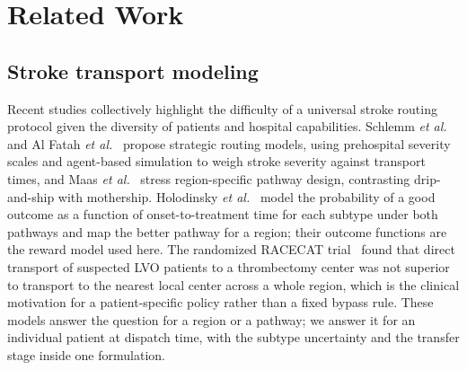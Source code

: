\section{Related Work}
\label{sec:related}

\subsection{Stroke transport modeling}
Recent studies collectively highlight the difficulty of a universal stroke routing protocol given the diversity of patients and hospital capabilities. Schlemm \emph{et al.}~\cite{schlemm2017} and Al Fatah \emph{et al.}~\cite{alfatah2018} propose strategic routing models, using prehospital severity scales and agent-based simulation to weigh stroke severity against transport times, and Maas \emph{et al.}~\cite{maas2020} stress region-specific pathway design, contrasting drip-and-ship with mothership. Holodinsky \emph{et al.}~\cite{holodinsky2018} model the probability of a good outcome as a function of onset-to-treatment time for each subtype under both pathways and map the better pathway for a region; their outcome functions are the reward model used here. The randomized RACECAT trial~\cite{racecat2022} found that direct transport of suspected LVO patients to a thrombectomy center was not superior to transport to the nearest local center across a whole region, which is the clinical motivation for a patient-specific policy rather than a fixed bypass rule. These models answer the question for a region or a pathway; we answer it for an individual patient at dispatch time, with the subtype uncertainty and the transfer stage inside one formulation.

